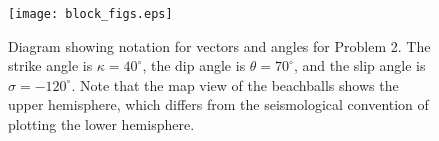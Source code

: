 \documentclass[11pt,titlepage,fleqn]{article}
\begin{document}
\clearpage\pagebreak
\begin{figure}
\centering
\texttt{[image: block\_figs.eps]}
\caption[]
{{
Diagram showing notation for vectors and angles for Problem 2. The strike angle is $\kappa = 40^\circ$, the dip angle is $\theta = 70^\circ$, and the slip angle is $\sigma = -120^\circ$.
Note that the map view of the beachballs shows the upper hemisphere, which differs from the seismological convention of plotting the lower hemisphere.
\label{fig:cmt}
}}
\end{figure}

\end{document}
